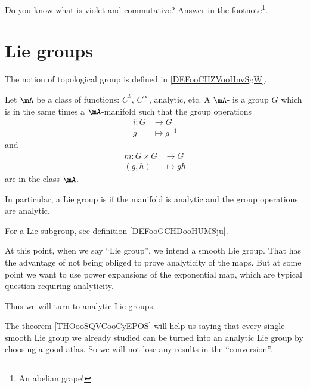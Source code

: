 
Do you know what is violet and commutative? Answer in the footnote\footnote{An abelian grape!}.


\section{Lie groups}

The notion of topological group is defined in \ref{DEFooCHZVooHnvSgW}.


\begin{definition}      \label{DEFooGDWTooTvINuw}
	Let \( \mA\) be a class of functions: \( C^k\), \(  C^{\infty}\), analytic, etc. A \( \mA\)- is a group $G$ which is in the same times a \( \mA\)-manifold such that the group operations
	\begin{equation}
		\begin{aligned}
			i\colon G & \to G          \\
			g         & \mapsto g^{-1}
		\end{aligned}
	\end{equation}
	and
	\begin{equation}
		\begin{aligned}
			m\colon G\times G & \to G      \\
			(g,h)             & \mapsto gh
		\end{aligned}
	\end{equation}
	are in the class \( \mA\).

	In particular, a Lie group is  if the manifold is analytic and the group operations are analytic.

\end{definition}
For a Lie subgroup, see definition \ref{DEFooGCHDooHUMSju}.

\begin{normaltext}
	At this point, when we say ``Lie group'', we intend a smooth Lie group. That has the advantage of not being obliged to prove analyticity of the maps. But at some point we want to use power expansions of the exponential map, which are typical question requiring analyticity.

	Thus we will turn to analytic Lie groups.

	The theorem \ref{THOooSQVCooCyEPOS} will help us saying that every single smooth Lie group we already studied can be turned into an analytic Lie group by choosing a good atlas. So we will not lose any results in the ``conversion''.
\end{normaltext}

